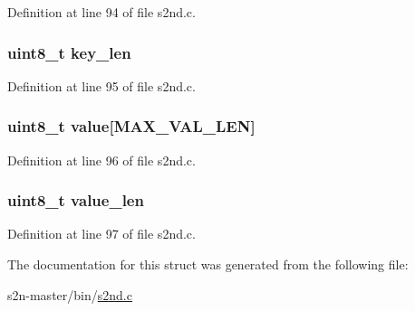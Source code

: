 Definition at line 94 of file s2nd.\+c.

\subsubsection[{\texorpdfstring{key\+\_\+len}{key_len}}]{\setlength{\rightskip}{0pt plus 5cm}uint8\+\_\+t key\+\_\+len}\hypertarget{structsession__cache__entry_a81d756c926cde8076992a83a9b3ea657}{}\label{structsession__cache__entry_a81d756c926cde8076992a83a9b3ea657}


Definition at line 95 of file s2nd.\+c.

\subsubsection[{\texorpdfstring{value}{value}}]{\setlength{\rightskip}{0pt plus 5cm}uint8\+\_\+t value\mbox{[}{\bf M\+A\+X\+\_\+\+V\+A\+L\+\_\+\+L\+EN}\mbox{]}}\hypertarget{structsession__cache__entry_af8b1b26a770e1882441830cadd6b94e7}{}\label{structsession__cache__entry_af8b1b26a770e1882441830cadd6b94e7}


Definition at line 96 of file s2nd.\+c.

\subsubsection[{\texorpdfstring{value\+\_\+len}{value_len}}]{\setlength{\rightskip}{0pt plus 5cm}uint8\+\_\+t value\+\_\+len}\hypertarget{structsession__cache__entry_ae02b3e5d161799d5639f0f0b9877997c}{}\label{structsession__cache__entry_ae02b3e5d161799d5639f0f0b9877997c}


Definition at line 97 of file s2nd.\+c.



The documentation for this struct was generated from the following file\+:\begin{DoxyCompactItemize}
\item 
s2n-\/master/bin/\hyperlink{s2nd_8c}{s2nd.\+c}\end{DoxyCompactItemize}
